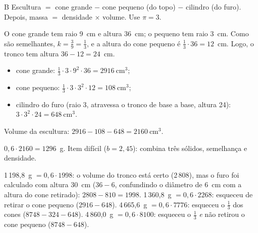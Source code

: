\begin{resolucao}{B}
 Escultura $=$ cone grande $-$ cone pequeno (do topo) $-$
cilindro (do furo). Depois, massa $=$ densidade $\times$ volume. Use $\pi = 3$.

 O cone grande tem raio 9~cm e
altura 36~cm; o pequeno tem raio 3~cm. Como são semelhantes,
$k = \frac39 = \frac13$, e a altura do cone pequeno é $\frac13\cdot 36 = 12$~cm.
Logo, o tronco tem altura $36 - 12 = 24$~cm.

\begin{itemize}[nosep,leftmargin=1.2em]
  \item cone grande: $\frac13\cdot 3\cdot 9^2\cdot 36 = 2916\ \text{cm}^3$;
  \item cone pequeno: $\frac13\cdot 3\cdot 3^2\cdot 12 = 108\ \text{cm}^3$;
  \item cilindro do furo (raio 3, atravessa o tronco de base a base, altura 24):
        $3\cdot 3^2\cdot 24 = 648\ \text{cm}^3$.
\end{itemize}
Volume da escultura: $2916 - 108 - 648 = 2160\ \text{cm}^3$.

 $0{,}6\cdot 2160 = 1296$~g. Item difícil ($b = 2{,}45$): combina
três sólidos, semelhança e densidade.

\begin{distratores}
 1\,198,8~g $= 0{,}6\cdot 1998$: o volume do tronco está certo (2\,808),
mas o furo foi calculado com altura 30~cm ($36 - 6$, confundindo o diâmetro de
6~cm com a altura do cone retirado): $2808 - 810 = 1998$.
 1\,360,8~g $= 0{,}6\cdot 2268$: esqueceu de retirar o cone pequeno
($2916 - 648$).
 4\,665,6~g $= 0{,}6\cdot 7776$: esqueceu o $\frac13$ dos cones
($8748 - 324 - 648$).
 4\,860,0~g $= 0{,}6\cdot 8100$: esqueceu o $\frac13$ \emph{e} não retirou
o cone pequeno ($8748 - 648$).
\end{distratores}
\end{resolucao}

